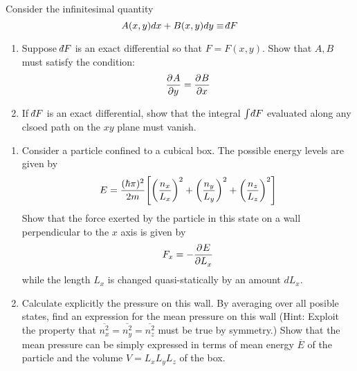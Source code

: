 \documentclass{article}
\begin{document}
\begin{problem}[Reif 2.5]
    Consider the infinitesimal quantity $$A(x,y)dx+B(x,y)dy\equiv\dbar F$$
    \begin{enumerate}[label=(\alph*)]
        \item Suppose $\dbar F$ is an exact differential so that $F=F(x,y)$. Show that $A,B$ must satisfy the condition: $$\pder{A}{y}=\pder{B}{x}$$
        \item If $\dbar F$ is an exact differential, show that the integral $\int \dbar F$ evaluated along any clsoed path on the $xy$ plane must vanish.
    \end{enumerate}
    \answerline
\end{problem}\newpage
\begin{problem}[Reif 2.7]
    \begin{enumerate}[label=(\alph*)]
        \item Consider a particle confined to a cubical box. The possible energy levels are given by $$E=\frac{(\hbar \pi)^2}{2m}\qty[\qty(\frac{n_x}{L_x})^2+ \qty(\frac{n_y}{L_y})^2+ \qty(\frac{n_z}{L_z})^2]$$ Show that the force exerted by the particle in this state on a wall perpendicular to the $x$ axis is given by $$F_x=-\pder{E}{L_x}$$ while the length $L_x$ is changed quasi-statically by an amount $d L_x$.
        \item Calculate explicitly the pressure on this wall. By averaging over all posible states, find an expression for the mean pressure on this wall (Hint: Exploit the property that $\overline{n_x^2}=\overline{n_y^2}=\overline{n_z^2}$ must be true by symmetry.) Show that the mean pressure can be simply expressed in terms of mean energy $\overline{E}$ of the particle and the volume $V=L_xL_yL_z$ of the box.  
    \end{enumerate}
    \answerline
\end{problem}
\end{document}
